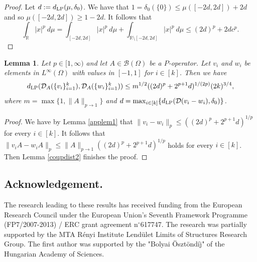 \documentclass[a4wider]{amsart}
\newtheorem{lemma}[theorem]{Lemma}
\theoremstyle{definitionbreak}\newtheorem{D}[theorem]{Definition}
\theoremstyle{definitionbreak}\newtheorem*{D*}{Definition}
\begin{document}
\begin{proof} Let $d:=d_{\rm LP}(\mu,\delta_{0})$. We have that $1=\delta_0(\{0\})\leq \mu([-2d,2d])+2d$ and so $\mu([-2d,2d])\geq 1-2d$. It follows that
$$\int_{\mathbb{R}} |x|^p~d\mu=\int_{[-2d,2d]}|x|^p~d\mu+\int_{\mathbb{R}\setminus [-2d,2d]}|x|^p~d\mu\leq (2d)^p+2dc^p.$$
\end{proof} 


\begin{lemma}\label{applem2} Let $p\in [1,\infty)$ and let $A\in\mathcal{B}(\Omega)$ be a $P$-operator. Let  $v_i$ and $w_i$ be elements in $L^\infty(\Omega)$ with values in $[-1,1]$ for $i\in [k]$. Then we have
$$d_{\rm LP}(\mathcal{D}_A(\{v_i\}_{i=1}^k),\mathcal{D}_A(\{w_i\}_{i=1}^k))\leq m^{1/2}((2d)^p+2^{p+1}d)^{1/(2p)}(2k)^{3/4},$$ where $m=\max\{1,\|A\|_{p\to 1}\}$ and $d=\max_{i\in [k]}\{d_{\rm LP}(\mathcal{D}(v_i-w_i),\delta_0)\}$.
\end{lemma}

\begin{proof} We have by Lemma \ref{applem1} that $\|v_i-w_i\|_p\leq ((2d)^p+2^{p+1}d)^{1/p}$ for every $i\in[k]$. It follows that $\|v_iA-w_iA\|_p\leq  \|A\|_{p\to 1} ((2d)^p+2^{p+1}d)^{1/p}$ holds for every $i\in[k]$. Then Lemma \ref{coupdist2} finishes the proof.
\end{proof}

\subsection*{Acknowledgement.} The research leading to these results has received funding from the European Research Council under the European Union's Seventh Framework Programme (FP7/2007-2013) / ERC grant agreement n$^{\circ}$617747. The research was partially supported by the MTA R\'enyi Institute Lend\"ulet Limits of Structures Research Group. The first author was supported by the "Bolyai \"Oszt\"ond\'ij" of the Hungarian Academy of Sciences.
\end{document}
